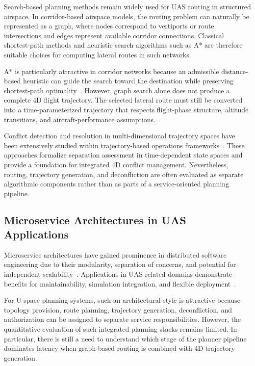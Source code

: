 Search-based planning methods remain widely used for UAS routing in structured airspace. In corridor-based airspace models, the routing problem can naturally be represented as a graph, where nodes correspond to vertiports or route intersections and edges represent available corridor connections. Classical shortest-path methods and heuristic search algorithms such as A* are therefore suitable choices for computing lateral routes in such networks.

A* is particularly attractive in corridor networks because an admissible distance-based heuristic can guide the search toward the destination while preserving shortest-path optimality~\cite{sahawneh2016_3d_path_planning,a_star_2d3d_comparison_utm}. However, graph search alone does not produce a complete 4D flight trajectory. The selected lateral route must still be converted into a time-parameterized trajectory that respects flight-phase structure, altitude transitions, and aircraft-performance assumptions.

Conflict detection and resolution in multi-dimensional trajectory spaces have been extensively studied within trajectory-based operations frameworks~\cite{NDMap,enea_porretta_4d_tbo_comparison}. These approaches formalize separation assessment in time-dependent state spaces and provide a foundation for integrated 4D conflict management. Nevertheless, routing, trajectory generation, and deconfliction are often evaluated as separate algorithmic components rather than as parts of a service-oriented planning pipeline.

\subsection{Microservice Architectures in UAS Applications}

Microservice architectures have gained prominence in distributed software engineering due to their modularity, separation of concerns, and potential for independent scalability~\cite{dragoni2017microservices}. Applications in UAS-related domains demonstrate benefits for maintainability, simulation integration, and flexible deployment~\cite{matlekovic2020uav}.

For U-space planning systems, such an architectural style is attractive because topology provision, route planning, trajectory generation, deconfliction, and authorization can be assigned to separate service responsibilities. However, the quantitative evaluation of such integrated planning stacks remains limited. In particular, there is still a need to understand which stage of the planner pipeline dominates latency when graph-based routing is combined with 4D trajectory generation.

